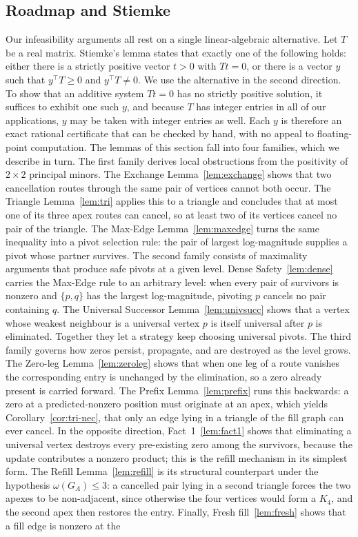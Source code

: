 \documentclass[11pt]{article}
\theoremstyle{plain}
\theoremstyle{definition}
\theoremstyle{remark}
\begin{document}
\subsection{Roadmap and Stiemke}
\label{sec:roadmap}
\begin{humanblock}
Our infeasibility arguments all rest on a single linear-algebraic alternative. Let $T$ be a real matrix. Stiemke's lemma \cite{Stiemke,Gordan} states that exactly one of the following holds: either there is a strictly positive vector $t>0$ with $Tt=0$, or there is a vector $y$ such that $y^\top T\ge0$ and $y^\top T\neq0$. We use the alternative in the second direction. To show that an additive system $Tt=0$ has no strictly positive solution, it suffices to exhibit one such $y$, and because $T$ has integer entries in all of our applications, $y$ may be taken with integer entries as well. Each $y$ is therefore an exact rational certificate that can be checked by hand, with no appeal to floating-point computation. The lemmas of this section fall into four families, which we describe in turn. The first family derives local obstructions from the positivity of $2\times2$ principal minors. The Exchange Lemma~\ref{lem:exchange} shows that two cancellation routes through the same pair of vertices cannot both occur. The Triangle Lemma~\ref{lem:tri} applies this to a triangle and concludes that at most one of its three apex routes can cancel, so at least two of its vertices cancel no pair of the triangle. The Max-Edge Lemma~\ref{lem:maxedge} turns the same inequality into a pivot selection rule: the pair of largest log-magnitude supplies a pivot whose partner survives. The second family consists of maximality arguments that produce safe pivots at a given level. Dense Safety~\ref{lem:dense} carries the Max-Edge rule to an arbitrary level: when every pair of survivors is nonzero and $\{p,q\}$ has the largest log-magnitude, pivoting $p$ cancels no pair containing $q$. The Universal Successor Lemma~\ref{lem:univsucc} shows that a vertex whose weakest neighbour is a universal vertex $p$ is itself universal after $p$ is eliminated. Together they let a strategy keep choosing universal pivots. The third family governs how zeros persist, propagate, and are destroyed as the level grows. The Zero-leg Lemma~\ref{lem:zeroleg} shows that when one leg of a route vanishes the corresponding entry is unchanged by the elimination, so a zero already present is carried forward. The Prefix Lemma~\ref{lem:prefix} runs this backwards: a zero at a predicted-nonzero position must originate at an apex, which yields Corollary~\ref{cor:tri-nec}, that only an edge lying in a triangle of the fill graph can ever cancel. In the opposite direction, Fact~1~\ref{lem:fact1} shows that eliminating a universal vertex destroys every pre-existing zero among the survivors, because the update contributes a nonzero product; this is the refill mechanism in its simplest form. The Refill Lemma~\ref{lem:refill} is its structural counterpart under the hypothesis $\omega(G_A)\le3$: a cancelled pair lying in a second triangle forces the two apexes to be non-adjacent, since otherwise the four vertices would form a $K_4$, and the second apex then restores the entry. Finally, Fresh fill~\ref{lem:fresh} shows that a fill edge is nonzero at the 
\end{humanblock}
\end{document}
